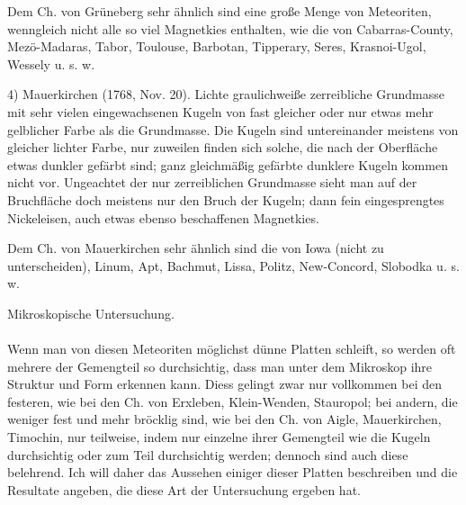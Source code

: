 \documentclass[a4paper, 11pt, oneside]{article}
\begin{document}
Dem Ch. von Grüneberg sehr ähnlich sind eine große Menge von Meteoriten, wenngleich nicht alle so viel Magnetkies enthalten, wie die von Cabarras-County, Mezö-Madaras, Tabor, Toulouse, Barbotan, Tipperary, Seres, Krasnoi-Ugol, Wessely u. s. w.

4) Mauerkirchen (1768, Nov. 20). Lichte graulichweiße zerreibliche Grundmasse mit sehr vielen eingewachsenen Kugeln von fast gleicher oder nur etwas mehr gelblicher Farbe als die Grundmasse. Die Kugeln sind untereinander meistens von gleicher lichter Farbe, nur zuweilen finden sich solche, die nach der Oberfläche etwas dunkler gefärbt sind; ganz gleichmäßig gefärbte dunklere Kugeln kommen nicht vor. Ungeachtet der nur zerreiblichen Grundmasse sieht man auf der Bruchfläche doch meistens nur den Bruch der Kugeln; dann fein eingesprengtes Nickeleisen, auch etwas ebenso beschaffenen Magnetkies.

Dem Ch. von Mauerkirchen sehr ähnlich sind die von Iowa (nicht zu unterscheiden), Linum, Apt, Bachmut, Lissa, Politz, New-Concord, Slobodka u. s. w.
\begin{center}
Mikroskopische Untersuchung.
\end{center}
\paragraph{}
Wenn man von diesen Meteoriten möglichst dünne Platten schleift, so werden oft mehrere der Gemengteil so durchsichtig, dass man unter dem Mikroskop ihre Struktur und Form erkennen kann. Diess gelingt zwar nur vollkommen bei den festeren, wie bei den Ch. von Erxleben, Klein-Wenden, Stauropol; bei andern, die weniger fest und mehr bröcklig sind, wie bei den Ch. von Aigle, Mauerkirchen, Timochin, nur teilweise, indem nur einzelne ihrer Gemengteil wie die Kugeln durchsichtig oder zum Teil durchsichtig werden; dennoch sind auch diese belehrend. Ich will daher das Aussehen einiger dieser Platten beschreiben und die Resultate angeben, die diese Art der Untersuchung ergeben hat.
\end{document}
